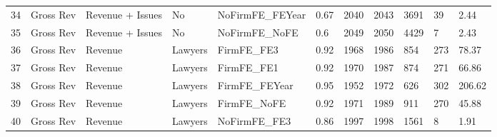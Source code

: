 \documentclass{article}
\begin{document}
\begin{table}[H]
\begin{tabular}{rllllllllll}
  34 & Gross Rev & Revenue + Issues & No & NoFirmFE\_FEYear & 0.67 & 2040 & 2043 & 3691 & 39 & 2.44 \\ 
  35 & Gross Rev & Revenue + Issues & No & NoFirmFE\_NoFE & 0.6 & 2049 & 2050 & 4429 & 7 & 2.43 \\ 
  36 & Gross Rev & Revenue & Lawyers & FirmFE\_FE3 & 0.92 & 1968 & 1986 & 854 & 273 & 78.37 \\ 
  37 & Gross Rev & Revenue & Lawyers & FirmFE\_FE1 & 0.92 & 1970 & 1987 & 874 & 271 & 66.86 \\ 
  38 & Gross Rev & Revenue & Lawyers & FirmFE\_FEYear & 0.95 & 1952 & 1972 & 626 & 302 & 206.62 \\ 
  39 & Gross Rev & Revenue & Lawyers & FirmFE\_NoFE & 0.92 & 1971 & 1989 & 911 & 270 & 45.88 \\ 
  40 & Gross Rev & Revenue & Lawyers & NoFirmFE\_FE3 & 0.86 & 1997 & 1998 & 1561 & 8 & 1.91 \\ 
   \hline
\end{tabular}
\end{table}
\end{document}
